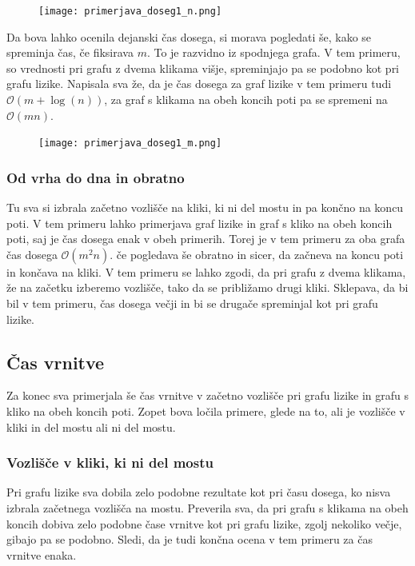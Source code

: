 \documentclass[12pt,a4paper]{amsart}
\begin{document}
\begin{figure}[h]
\texttt{[image: primerjava\_doseg1\_n.png]}
\end{figure}

Da bova lahko ocenila dejanski čas dosega, si morava pogledati še, kako se spreminja čas, če fiksirava $m$. To je razvidno iz spodnjega
grafa. V tem primeru, so vrednosti pri grafu z dvema klikama višje, spreminjajo pa se podobno kot pri grafu lizike.
Napisala sva že, da je čas dosega za graf lizike v tem primeru tudi $\mathcal{O}(m+\log(n))$, za graf s klikama na obeh koncih poti
pa se spremeni na $\mathcal{O}(mn)$.

\begin{figure}[h]
\texttt{[image: primerjava\_doseg1\_m.png]}
\end{figure}

\subsubsection{Od vrha do dna in obratno}

Tu sva si izbrala začetno vozlišče na kliki, ki ni del mostu in pa končno na koncu poti. V tem primeru lahko primerjava
graf lizike in graf s kliko na obeh koncih poti, saj je čas dosega enak v obeh primerih. Torej je v tem primeru za oba grafa
čas dosega $\mathcal{O}(m^2n)$. če pogledava še obratno in sicer, da začneva na koncu poti in končava na kliki. V tem primeru se lahko zgodi,
da pri grafu z dvema klikama, že na začetku izberemo vozlišče, tako da se približamo drugi kliki. Sklepava, da bi bil v tem primeru,
čas dosega večji in bi se drugače spreminjal kot pri grafu lizike.

\subsection{Čas vrnitve}

Za konec sva primerjala še čas vrnitve v začetno vozlišče pri grafu lizike in grafu s kliko na obeh koncih poti. 
Zopet bova ločila primere, glede na to, ali je vozlišče v kliki in del mostu ali ni del mostu.

\subsubsection{Vozlišče v kliki, ki ni del mostu}
Pri grafu lizike sva dobila zelo podobne rezultate kot pri času dosega, ko nisva izbrala začetnega vozlišča na mostu. 
Preverila sva, da pri grafu s klikama na obeh koncih dobiva zelo podobne čase vrnitve kot pri grafu lizike, zgolj
nekoliko večje, gibajo pa se podobno. Sledi, da je tudi končna ocena v tem primeru za čas vrnitve enaka.
\end{document}
